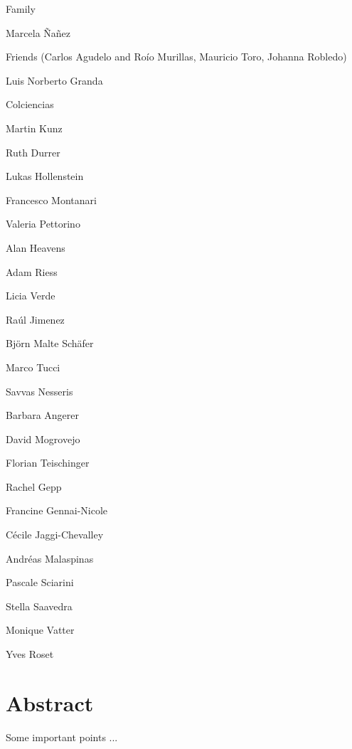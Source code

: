 \documentclass[12pt]{report}
\renewcommand{\(}{\left(}
\renewcommand{\)}{\right)}
\renewcommand{\[}{\left[}
\renewcommand{\]}{\right]}
\begin{document}
Family 

Marcela \~{N}a\~{n}ez

Friends (Carlos Agudelo and Ro\'{i}o Murillas, Mauricio Toro, Johanna Robledo)

Luis Norberto Granda 

Colciencias 

Martin Kunz 

Ruth Durrer

Lukas Hollenstein 

Francesco Montanari 

Valeria Pettorino

Alan Heavens

Adam Riess

Licia Verde 

Ra\'{u}l Jimenez 

Bj\"{o}rn Malte Sch\"{a}fer

Marco Tucci

Savvas Nesseris

Barbara Angerer 

David Mogrovejo 

Florian Teischinger 

Rachel Gepp

Francine Gennai-Nicole

C\'{e}cile Jaggi-Chevalley

Andr\'{e}as Malaspinas

Pascale Sciarini

Stella Saavedra

Monique Vatter 

Yves Roset
  
\newpage  

\chapter*{Abstract}  

\vspace{3mm}

Some important points ...

\newpage

\tableofcontents



\newpage




%
\end{document}
